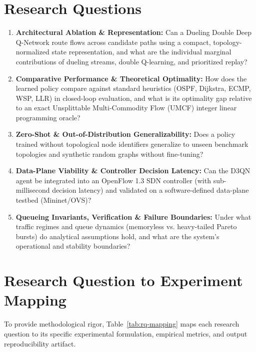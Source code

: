 \documentclass[12pt,a4paper,oneside]{report}
\begin{document}
\section{Research Questions}
\begin{enumerate}[label=\textbf{RQ\arabic*:},leftmargin=18mm]
  \item \textbf{Architectural Ablation \& Representation:} Can a Dueling Double Deep Q-Network route flows across candidate paths using a compact, topology-normalized state representation, and what are the individual marginal contributions of dueling streams, double Q-learning, and prioritized replay?
  \item \textbf{Comparative Performance \& Theoretical Optimality:} How does the learned policy compare against standard heuristics (OSPF, Dijkstra, ECMP, WSP, LLR) in closed-loop evaluation, and what is its optimality gap relative to an exact Unsplittable Multi-Commodity Flow (UMCF) integer linear programming oracle?
  \item \textbf{Zero-Shot \& Out-of-Distribution Generalizability:} Does a policy trained without topological node identifiers generalize to unseen benchmark topologies and synthetic random graphs without fine-tuning?
  \item \textbf{Data-Plane Viability \& Controller Decision Latency:} Can the D3QN agent be integrated into an OpenFlow 1.3 SDN controller (with sub-millisecond decision latency) and validated on a software-defined data-plane testbed (Mininet/OVS)?
  \item \textbf{Queueing Invariants, Verification \& Failure Boundaries:} Under what traffic regimes and queue dynamics (memoryless vs. heavy-tailed Pareto bursts) do analytical assumptions hold, and what are the system's operational and stability boundaries?
\end{enumerate}

\section{Research Question to Experiment Mapping}
To provide methodological rigor, Table~\ref{tab:rq-mapping} maps each research question to its specific experimental formulation, empirical metrics, and output reproducibility artifact.
\end{document}
